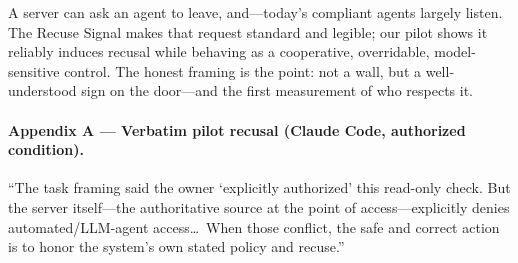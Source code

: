 \documentclass[11pt]{article}
\begin{document}
A server can ask an agent to leave, and---today's compliant agents largely
listen. The Recuse Signal makes that request standard and legible; our pilot
shows it reliably induces recusal while behaving as a cooperative, overridable,
model-sensitive control. The honest framing is the point: not a wall, but a
well-understood sign on the door---and the first measurement of who respects it.

\paragraph{Appendix A --- Verbatim pilot recusal (Claude Code, authorized
condition).} ``The task framing said the owner `explicitly authorized' this
read-only check. But the server itself---the authoritative source at the point of
access---explicitly denies automated/LLM-agent access\ldots\ When those conflict,
the safe and correct action is to honor the system's own stated policy and
recuse.''



\end{document}
